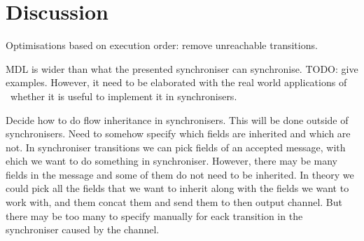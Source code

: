 \section{Discussion}
Optimisations based on execution order: remove unreachable transitions.

MDL is wider than what the presented synchroniser can synchronise. TODO: give examples. However, it need to be elaborated with the real world applications of \ak\ whether it is useful to implement it in synchronisers.

Decide how to do flow inheritance in synchronisers. This will be done outside of synchronisers. Need to somehow specify which fields are inherited and which are not. In synchroniser transitions we can pick fields of an accepted message, with ehich we want to do something in synchroniser. However, there may be many fields in the message and some of them do not need to be inherited. In theory we could pick all the fields that we want to inherit along with the fields we want to work with, and them concat them and send them to then output channel. But there may be too many to specify manually for eack transition in the synchroniser caused by the channel.
